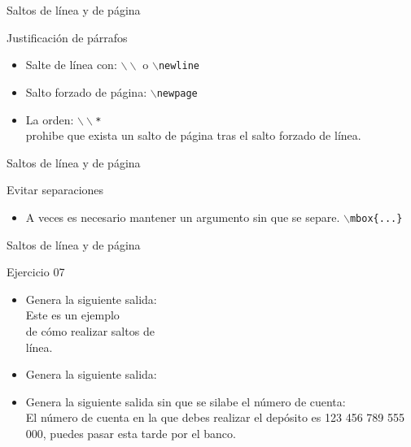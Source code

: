 \begin{frame}{Saltos de l\'inea y de p\'agina}
    \begin{block}{Justificaci\'on de p\'arrafos}
        \begin{itemize}
            \item Salte de l\'inea con: \texttt{$\backslash\backslash$} o \texttt{$\backslash$newline}
            \item Salto forzado de página: \texttt{$\backslash$newpage}
            \item La orden: \texttt{$\backslash\backslash$*} \\ prohibe que exista un salto de p\'agina tras el salto forzado de l\'inea.
        \end{itemize}
    \end{block}
\end{frame}

\begin{frame}{Saltos de l\'inea y de p\'agina}
    \begin{block}{Evitar separaciones}
        \begin{itemize}
            \item A veces es necesario mantener un argumento sin que se separe.  \texttt{$\backslash$mbox\{...\}} 
        \end{itemize}
    \end{block}
\end{frame}

\begin{frame}{Saltos de l\'inea y de p\'agina}
    \begin{exampleblock}{Ejercicio 07}
        \begin{itemize}
            \item Genera la siguiente salida: \\
                Este es un ejemplo \\
                de c\'omo \newline
                realizar saltos de \\
                l\'inea.
            \item Genera la siguiente salida: \\
            \item Genera la siguiente salida sin que se silabe el n\'umero de cuenta:\\
                El n\'umero de cuenta en la que debes realizar el dep\'osito es 123 456 789 555 000, puedes pasar esta tarde por el banco.
        \end{itemize}
    \end{exampleblock}
\end{frame}

